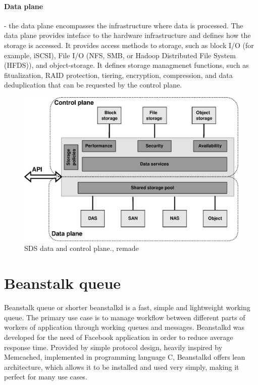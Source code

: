     \paragraph{Data plane}
    - the data plane encompasses the infrastructure where data is processed. The data plane provides inteface to the hardware infrastructure and defines how the storage is accessed. It provides access methods to storage, such as block I/O (for example, iSCSI), File I/O (NFS, SMB, or Hadoop Distributed File System (HFDS)), and object-storage. It defines storage managmenet functions, such as fitualization, RAID protection, tiering, encryption, compression, and data deduplication that can be requested by the control plane\cite{sdsIBMSDSGuide}.

    \begin{figure}[hbt]
        \centering
        \includegraphics[width=1\textwidth]{obrazky-figures/sds-planes.eps}
        \caption{SDS data and control plane.\cite{sdsPlanes}, remade}
        \label{fig:sdsPlanes}
    \end{figure}

\section{Beanstalk queue}

    Beanstalk queue or shorter beanstalkd is a fast, simple and lightweight working queue\cite{beanstalkdOfficial}. The primary use case is to manage workflow between different parts of workers of application through working queues and messages. Beanstalkd was developed for the need of Facebook application in order to reduce average response time\cite{beanstalkdOfficial}. Provided by simple protocol design, heavily inspired by Memcached, implemented in programming language C, Beanstalkd offers lean architecture, which allows it to be installed and used very simply, making it perfect for many use cases\cite{beanstalkdInstall}.


